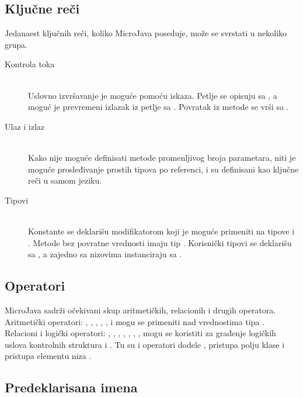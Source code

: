 \subsection*{Ključne reči}

Jedanaest ključnih reči, koliko MicroJava poseduje, može se svrstati u nekoliko grupa.

\begin{description}
    \item[Kontrola toka] \hfill \\
    Uslovno izvršavanje je moguće pomoću  iskaza. 
    Petlje se opisuju sa , a moguć je prevremeni izlazak iz petlje sa . 
    Povratak iz metode se vrši sa .

   \item[Ulaz i izlaz] \hfill \\
	Kako nije moguće definisati metode promenljivog broja parametara, niti je moguće prosleđivanje prostih tipova po referenci,  i  su definisani kao ključne reči u samom jeziku.

	\item[Tipovi] \hfill \\
	Konstante se deklarišu modifikatorom  koji je moguće primeniti na tipove  i .
	Metode bez povratne vrednosti imaju tip . 
	Korisnički tipovi se deklarišu sa , a zajedno sa nizovima instanciraju sa .

\end{description}


\subsection*{Operatori}

MicroJava sadrži očekivani skup aritmetičkih, relacionih i drugih operatora.
Aritmetički operatori: \mj{+}, \mj{-}, \mj{*}, \mj{\%}, \mj{/}, \mj{++} i \mj{--} mogu se primeniti nad vrednostima tipa .
Relacioni i logički operatori: \mj{==}, \mj{>}, \mj{<}, \mj{>=}, \mj{<=}, \mj{!=}, \mj{\&\&}, \mj{||} mogu se koristiti za građenje logičkih uslova kontrolnih struktura  i .
Tu su i operatori dodele \mj{=}, pristupa polju klase  i pristupa elementu niza \mj{[]}.

\subsection*{Predeklarisana imena}

